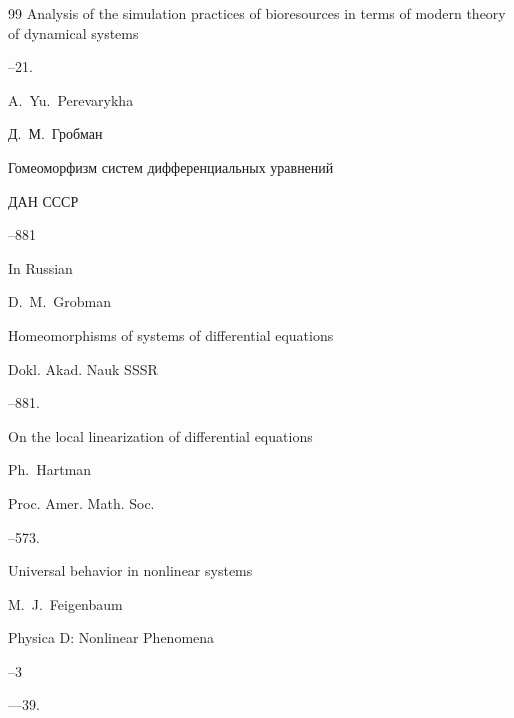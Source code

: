 \begin{thebibliography}{99}
\paper Analysis of the simulation practices of bioresources in terms of modern theory of dynamical systems 



--21.

\by A.~Yu.~Perevarykha






\by Д.~М.~Гробман

\paper Гомеоморфизм систем дифференциальных уравнений

\jour ДАН СССР 




–881

\misctransl

\lang In Russian

\by  D.~M.~Grobman

\paper Homeomorphisms of systems of differential equations

\jour Dokl. Akad. Nauk SSSR 



–881.






\paper On the local linearization of differential equations

\by Ph.~Hartman 

\jour Proc. Amer. Math. Soc. 




--573.





\paper Universal behavior in nonlinear systems 

\by M.~J.~Feigenbaum

\jour Physica D: Nonlinear Phenomena


--3


—39.


\end{thebibliography}

